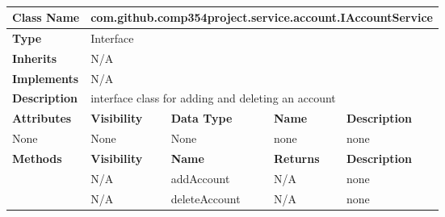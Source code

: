 \documentclass[12pt]{article}
\begin{document}
\begin{table}[H]
\centering
\caption{}
\label{my-label}
\begin{tabular}{|l|l|l|l|l|}
\hline
\textbf{Class Name}               & \multicolumn{4}{l|}{com.github.comp354project.service.account.IAccountService}     \\ \hline
\textbf{Type}                     & \multicolumn{4}{l|}{Interface}                                                     \\ \hline
\textbf{Inherits}                 & \multicolumn{4}{l|}{N/A}                                                           \\ \hline
\textbf{Implements}               & \multicolumn{4}{l|}{N/A}                                                           \\ \hline
\textbf{Description}              & \multicolumn{4}{l|}{interface class for adding and deleting an account}            \\ \hline
\textbf{Attributes}               & \textbf{Visibility} & \textbf{Data Type} & \textbf{Name}    & \textbf{Description} \\ \hline
None                              & None                & None               & none             & none                 \\ \hline
\multirow{3}{*}{\textbf{Methods}} & \textbf{Visibility} & \textbf{Name}      & \textbf{Returns} & \textbf{Description} \\ \cline{2-5} 
                                  & N/A                 & addAccount         & N/A              & none                 \\ \cline{2-5} 
                                  & N/A                 & deleteAccount      & N/A              & none                 \\ \hline
\end{tabular}
\end{table}
\end{document}
